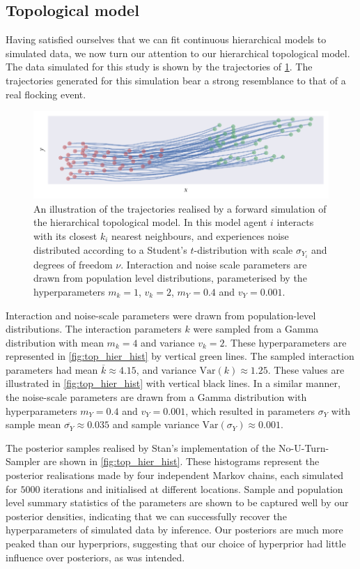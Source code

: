 \subsection{Topological model}

Having satisfied ourselves that we can fit continuous hierarchical models to
simulated data, we now turn our attention to our hierarchical topological
model. The data simulated for this study is shown by the trajectories of
\cref{fig:top_hier_sim}. The trajectories generated for this simulation bear a
strong resemblance to that of a real flocking event.

\begin{figure}[tbp]
  \includegraphics{top_hier_sim.pdf}
  \caption{An illustration of the trajectories realised by a forward
    simulation of the hierarchical topological model. In this model agent $i$
    interacts with its closest $k_i$ nearest neighbours, and experiences noise
    distributed according to a Student's $t$-distribution with scale
    $\sigma_{Y_i}$ and degrees of freedom $\nu$. Interaction and noise scale
    parameters are drawn from population level distributions, parameterised by the
    hyperparameters $m_k=1$, $v_k=2$, $m_Y=0.4$ and $v_Y=0.001$.}
  \label{fig:top_hier_sim}
\end{figure}

Interaction and noise-scale parameters were drawn from population-level
distributions. The interaction parameters $k$ were sampled from a Gamma
distribution with mean $m_k=4$ and variance $v_k=2$. These hyperparameters are
represented in \cref{fig:top_hier_hist} by vertical green lines. The sampled
interaction parameters had mean $\overline{k}\approx4.15$, and variance
$\text{Var}(k)\approx1.25$. These values are illustrated in
\cref{fig:top_hier_hist} with vertical black lines. In a similar manner, the
noise-scale parameters are drawn from a Gamma distribution with hyperparameters
$m_Y=0.4$ and $v_Y=0.001$, which resulted in parameters $\sigma_Y$ with sample
mean $\overline{\sigma_Y}\approx0.035$ and sample variance
$\text{Var}(\sigma_Y)\approx0.001$.

The posterior samples realised by Stan's implementation of the
No-U-Turn-Sampler are shown in \cref{fig:top_hier_hist}. These histograms
represent the posterior realisations made by four independent Markov chains,
each simulated for $5000$ iterations and initialised at different locations.
Sample and population level summary statistics of the parameters are shown to
be captured well by our posterior densities, indicating that we can
successfully recover the hyperparameters of simulated data by inference. Our
posteriors are much more peaked than our hyperpriors, suggesting that our
choice of hyperprior had little influence over posteriors, as was intended.

